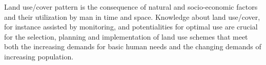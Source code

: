\documentclass[APA,LATO1COL,doublespace]{WileyNJD-v2}
\newcommand{\toberevised}[1]{\emph{\textcolor{red}{#1}}} %
\begin{document}
Land use/cover pattern is the consequence of natural and socio-economic factors and their utilization by man in time and space.
Knowledge about land use/cover, for instance assisted by monitoring, and potentialities for optimal use are crucial for the selection, planning and implementation of land use schemes that meet both the increasing demands for basic human needs and %
the changing demands of increasing population.
\end{document}
